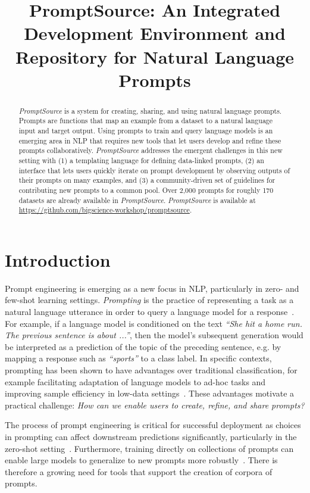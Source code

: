 \title{PromptSource: An Integrated Development Environment and Repository for Natural Language Prompts}

\begin{abstract}
\textit{PromptSource} is a system for creating, sharing, and using natural language prompts. Prompts are functions that map an example from a dataset to a natural language input and target output. Using prompts to train and query language models is an emerging area in NLP that requires new tools that let users develop and refine these prompts collaboratively.
\textit{PromptSource} addresses the emergent challenges in this new setting with (1) a templating language for defining data-linked prompts, (2) an interface that lets users quickly iterate on prompt development by observing outputs of their prompts on many examples, and (3) a community-driven set of guidelines for contributing new prompts to a common pool. Over 2,000 prompts for roughly 170 datasets are already available in \textit{PromptSource}. \textit{PromptSource} is available at \url{https://github.com/bigscience-workshop/promptsource}.
\end{abstract}

\section{Introduction}

Prompt engineering is emerging as a new focus in NLP, particularly in zero- and few-shot learning settings.
\emph{Prompting} is the practice of representing a task as a natural language utterance in order to query a language model for a response~\citep{liu:corr2021}. For example, if a language model is conditioned on the text \textit{``She hit a home run. The previous sentence is about ...''}, then the model's subsequent generation would be interpreted as a prediction of the topic of the preceding sentence, e.g. by mapping a response such as \textit{``sports''} to a class label. In specific contexts, prompting has been shown to have advantages over traditional classification, for example facilitating adaptation of language models to ad-hoc tasks and improving sample efficiency in low-data settings~\citep{brown2020gpt3,schick-schutze-2021-just,le-scao-rush-2021-many,gao-etal-2021-making}. These advantages motivate a practical challenge: \emph{How can we enable users to create, refine, and share prompts?}

The process of prompt engineering is critical for successful deployment as choices in prompting can affect downstream predictions significantly, particularly in the zero-shot setting~\cite{perez:neuraips2021,zhao:arxiv2021,albert:arxiv2021}. Furthermore, training directly on collections of prompts can enable large models to generalize to new prompts more robustly~\cite{sanh2021multitask,wei2021flan,metaicl,mishra:arxiv2021}. There is therefore a growing need for tools that support the creation of corpora of prompts.

